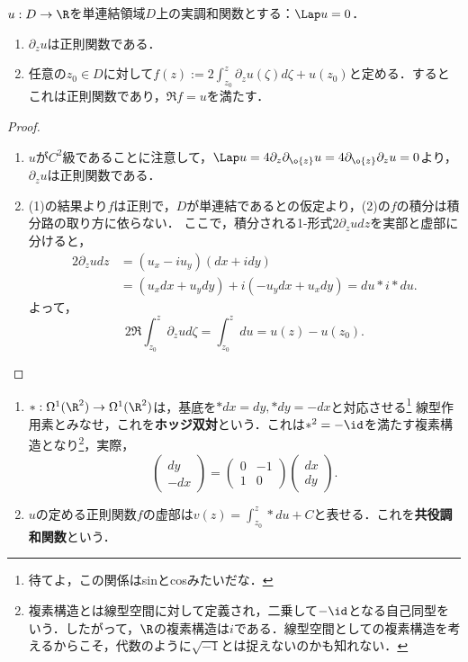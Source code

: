 \documentclass[uplatex, dvipdfmx]{jsreport}
\begin{document}
\begin{theorem}
    $u:D\to\R$を単連結領域$D$上の実調和関数とする：$\Lap u=0$．
    \begin{enumerate}
        \item $\partial_zu$は正則関数である．
        \item 任意の$z_0\in D$に対して$f(z):=2\int^z_{z_0}\partial_zu(\zeta)d\zeta+u(z_0)$と定める．するとこれは正則関数であり，$\Re f=u$を満たす．
    \end{enumerate}
\end{theorem}
\begin{proof}\mbox{}
    \begin{enumerate}
        \item $u$が$C^2$級であることに注意して，$\Lap u=4\partial_z\partial_{\o{z}}u=4\partial_{\o{z}}\partial_zu=0$より，$\partial_zu$は正則関数である．
        \item (1)の結果より$f$は正則で，$D$が単連結であるとの仮定より，(2)の$f$の積分は積分路の取り方に依らない．
        ここで，積分される1-形式$2\partial_zudz$を実部と虚部に分けると，
        \begin{align*}
            2\partial_zudz&=(u_x-iu_y)(dx+idy)\\
            &=(u_xdx+u_ydy)+i(-u_ydx+u_xdy)=du*i*du.
        \end{align*}
        よって，
        \[2\Re\int^z_{z_0}\partial_zud\zeta=\int^z_{z_0}du=u(z)-u(z_0).\]
    \end{enumerate}
\end{proof}

\begin{definition}\mbox{}
    \begin{enumerate}
        \item 
    $*:\Omega^1(\R^2)\to\Omega^1(\R^2)$は，基底を$*dx=dy,*dy=-dx$と対応させる\footnote{待てよ，この関係はsinとcosみたいだな．}
    線型作用素とみなせ，これを\textbf{ホッジ双対}という．これは$*^2=-\id$を満たす複素構造となり\footnote{複素構造とは線型空間に対して定義され，二乗して$-\id$となる自己同型をいう．したがって，$\R$の複素構造は$i$である．線型空間としての複素構造を考えるからこそ，代数のように$\sqrt{-1}$とは捉えないのかも知れない．}，実際，
    \[\begin{pmatrix}dy\\-dx\end{pmatrix}=\begin{pmatrix}0&-1\\1&0\end{pmatrix}\begin{pmatrix}dx\\dy\end{pmatrix}.\]
    \item $u$の定める正則関数$f$の虚部は$v(z)=\int^z_{z_0}*du+C$と表せる．これを\textbf{共役調和関数}という．
    \end{enumerate}
\end{definition}
\end{document}
